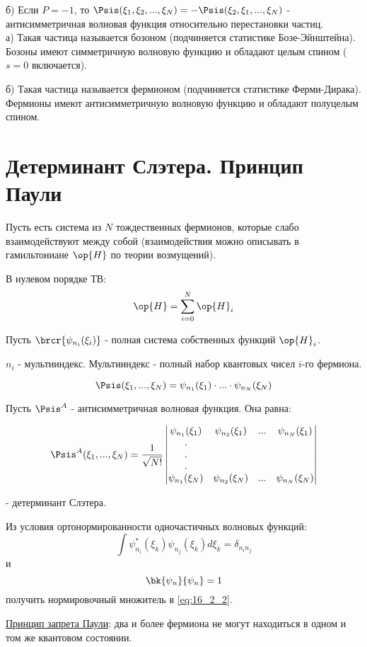 б) Если $P = -1$, то  $\Psis(\xi_1, \xi_2, ..., \xi_N) = -\Psis(\xi_2, \xi_1, ..., \xi_N)$ - антисимметричная волновая функция относительно перестановки частиц.\\

а) Такая частица называется бозоном (подчиняется статистике Бозе-Эйнштейна). Бозоны имеют симметричную волновую функцию и обладают целым спином ($s = 0$ включается).

б) Такая частица называется фермионом (подчиняется статистике Ферми-Дирака). Фермионы имеют антисимметричную волновую функцию и обладают полуцелым спином.

\section{Детерминант Слэтера. Принцип Паули}

Пусть есть система из $N$ тождественных фермионов, которые слабо взаимодействуют между собой (взаимодействия можно описывать в гамильтониане $\op{H}$ по теории возмущений).

В нулевом порядке ТВ:
$$
\op{H} = \sum_{i=0}^N\op{H}_i
$$

Пусть $\brcr{\psi_{n_i}(\xi_i)}$ - полная система собственных функций $\op{H}_i$.

$n_i$ - мультииндекс. Мультииндекс - полный набор квантовых чисел $i$-го фермиона.

\begin{equation}
\label{eq:16_2_1}
\Psis(\xi_1, ..., \xi_N) = \psi_{n_1}(\xi_1) \cdot ... \cdot \psi_{n_N}(\xi_N)
\end{equation}

Пусть $\Psis^A$ - антисимметричная волновая функция. Она равна:

\begin{equation}
\label{eq:16_2_2}
\Psis^A(\xi_1, ..., \xi_N) = \frac{1}{\sqrt{N!}} \left |
  \begin{matrix} 
  \psi_{n_1}(\xi_1) & \psi_{n_2}(\xi_1) & ... &  \psi_{n_N}(\xi_1) \\
  .                                &                                  &    &                                    \\
  .                                &                                  &    &                                    \\
  .                                &                                  &    &                                    \\
  \psi_{n_1}(\xi_N) & \psi_{n_2}(\xi_N) & ... &  \psi_{n_N}(\xi_N)
  \end{matrix} \right |
\end{equation}

- детерминант Слэтера.

\begin{excr}
Из условия ортонормированности одночастичных волновых функций: 
$$
\int \psi_{n_i}^*(\xi_k) \psi_{n_j}(\xi_k) d\xi_k = \delta_{n_i n_j}
$$
и 
$$
\bk{\psi_n}{\psi_n} = 1
$$
получить нормировочный множитель в \eqref{eq:16_2_2}.
\end{excr}

\underline{Принцип запрета Паули}: два и более фермиона не могут находиться в одном и том же квантовом состоянии.
